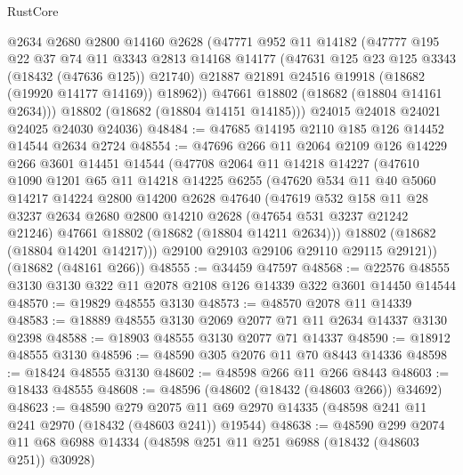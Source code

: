 \begin{lexlean}{RustCore}
\begin{coremodule}
          @2634
          @2680
          @2800
          @14160
          @2628
          (@47771
            @952
            @11
            @14182
            (@47777
              @195
              @22
              @37
              @74
              @11
              @3343
              @2813
              @14168
              @14177
              (@47631 @125 @23 @125 @3343 (@18432 (@47636 @125)) @21740)
              @21887
              @21891
              @24516
              @19918
              (@18682 (@19920 @14177 @14169))
              @18962))
          @47661
          @18802
          (@18682 (@18804 @14161 @2634)))
        @18802
        (@18682 (@18804 @14151 @14185)))
      @24015
      @24018
      @24021
      @24025
      @24030
      @24036)
@48484 := @47685 @14195 @2110 @185 @126 @14452 @14544 @2634 @2724
@48554 := @47696
    @266
    @11
    @2064
    @2109
    @126
    @14229
    @266
    @3601
    @14451
    @14544
    (@47708
      @2064
      @11
      @14218
      @14227
      (@47610
        @1090
        @1201
        @65
        @11
        @14218
        @14225
        @6255
        (@47620
          @534
          @11
          @40
          @5060
          @14217
          @14224
          @2800
          @14200
          @2628
          @47640
          (@47619
            @532
            @158
            @11
            @28
            @3237
            @2634
            @2680
            @2800
            @14210
            @2628
            (@47654 @531 @3237 @21242 @21246)
            @47661
            @18802
            (@18682 (@18804 @14211 @2634)))
          @18802
          (@18682 (@18804 @14201 @14217)))
        @29100
        @29103
        @29106
        @29110
        @29115
        @29121))
    (@18682 (@48161 @266))
@48555 := @34459 @47597
@48568 := @22576 @48555 @3130 @3130 @322 @11 @2078 @2108 @126 @14339 @322 @3601 @14450 @14544
@48570 := @19829 @48555 @3130
@48573 := @48570 @2078 @11 @14339
@48583 := @18889 @48555 @3130 @2069 @2077 @71 @11 @2634 @14337 @3130 @2398
@48588 := @18903 @48555 @3130 @2077 @71 @14337
@48590 := @18912 @48555 @3130
@48596 := @48590 @305 @2076 @11 @70 @8443 @14336
@48598 := @18424 @48555 @3130
@48602 := @48598 @266 @11 @266 @8443
@48603 := @18433 @48555
@48608 := @48596 (@48602 (@18432 (@48603 @266)) @34692)
@48623 := @48590
    @279
    @2075
    @11
    @69
    @2970
    @14335
    (@48598 @241 @11 @241 @2970 (@18432 (@48603 @241)) @19544)
@48638 := @48590
    @299
    @2074
    @11
    @68
    @6988
    @14334
    (@48598 @251 @11 @251 @6988 (@18432 (@48603 @251)) @30928)

\end{coremodule}
\end{lexlean}
